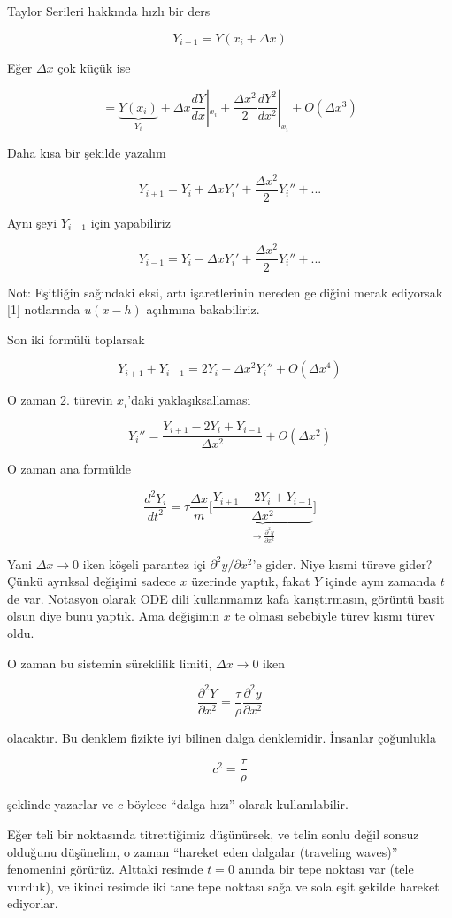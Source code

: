 \documentclass[12pt,fleqn]{article}\usepackage{../../common}
\begin{document}
Taylor Serileri hakkında hızlı bir ders

$$ Y_{i+1}=Y(x_i + \Delta x) $$

Eğer $\Delta x$ çok küçük ise

$$ = 
\underbrace{Y(x_i)}_{Y_i} + \Delta x \frac{dY}{dx}|_{x_i} + 
\frac{\Delta x^2}{2}\frac{dY^2}{dx^2}|_{x_i} + 
O(\Delta x^3)
$$

Daha kısa bir şekilde yazalım

$$ Y_{i+1} = Y_i + \Delta x Y_i' + \frac{\Delta x^2}{2}Y_i'' + ... 
$$

Aynı şeyi $Y_{i-1}$ için yapabiliriz

$$ Y_{i-1} = Y_i - \Delta x Y_i' + \frac{\Delta x^2}{2}Y_i'' + ... 
$$

Not: Eşitliğin sağındaki eksi, artı işaretlerinin nereden geldiğini merak
ediyorsak [1] notlarında $u(x-h)$ açılımına bakabiliriz.

Son iki formülü toplarsak

$$ Y_{i+1} + Y_{i-1} = 2Y_i + \Delta x^2 Y_i''  + O(\Delta x^4)$$

O zaman 2. türevin $x_i$'daki yaklaşıksallaması 

$$ Y_i'' = \frac{Y_{i+1} - 2Y_i + Y_{i-1}}{\Delta x^2} + O(\Delta x^2) $$

O zaman ana formülde

$$ \frac{d^2Y_i}{dt^2} = 
\tau \frac{\Delta x}{m} \bigg[\underbrace{
\frac{Y_{i+1} - 2Y_i + Y_{i-1}}{\Delta x^2}
}_{\to \frac{\partial ^2y}{\partial x^2}}
\bigg]
$$

Yani $\Delta x \to 0$ iken köşeli parantez içi $\partial ^2y/\partial x^2$'e
gider. Niye kısmi türeve gider? Çünkü ayrıksal değişimi sadece $x$ üzerinde
yaptık, fakat $Y$ içinde aynı zamanda $t$ de var. Notasyon olarak ODE dili
kullanmamız kafa karıştırmasın, görüntü basit olsun diye bunu yaptık. Ama
değişimin $x$ te olması sebebiyle türev kısmı türev oldu.

O zaman bu sistemin süreklilik limiti, $\Delta x \to 0$ iken

$$ 
\frac{\partial ^2Y}{\partial x^2} = 
\frac{\tau}{\rho}\frac{\partial ^2y}{\partial x^2}
 $$

olacaktır. Bu denklem fizikte iyi bilinen dalga denklemidir. İnsanlar
çoğunlukla 

$$ c^2 = \frac{\tau}{\rho} $$

şeklinde yazarlar ve $c$ böylece ``dalga hızı'' olarak kullanılabilir. 

Eğer teli bir noktasında titrettiğimiz düşünürsek, ve telin sonlu değil
sonsuz olduğunu düşünelim, o zaman ``hareket eden dalgalar (traveling
waves)'' fenomenini görürüz. Alttaki resimde $t=0$ anında bir tepe noktası
var (tele vurduk), ve ikinci resimde iki tane tepe noktası sağa ve sola
eşit şekilde hareket ediyorlar. 
\end{document}
